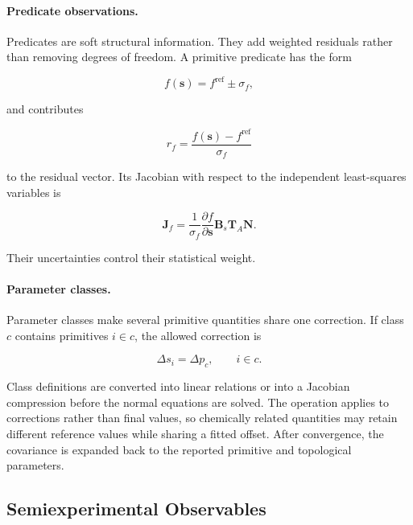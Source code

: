 \documentclass[journal=jctcce,manuscript=article,maxauthors=999]{achemso}
\begin{document}
\paragraph{Predicate observations.}

Predicates are soft structural information. They add weighted residuals rather
than removing degrees of freedom.\cite{Bartell1975Predicate} A primitive
predicate has the form

\begin{equation}
f(\mathbf{s})
=
f^{\mathrm{ref}}
\pm
\sigma_f ,
\end{equation}

and contributes

\begin{equation}
r_f
=
\frac{f(\mathbf{s})-f^{\mathrm{ref}}}{\sigma_f}
\end{equation}

to the residual vector. Its Jacobian with respect to the independent
least-squares variables is

\begin{equation}
\mathbf{J}_f
=
\frac{1}{\sigma_f}
\frac{\partial f}{\partial\mathbf{s}}
\mathbf{B}_s
\mathbf{T}_{A}
\mathbf{N}.
\end{equation}

Their uncertainties control their statistical weight.

\paragraph{Parameter classes.}

Parameter classes make several primitive quantities share one correction. If
class $c$ contains primitives $i\in c$, the allowed correction is

\begin{equation}
\Delta s_i
=
\Delta p_c,
\qquad
i\in c .
\end{equation}

Class definitions are converted into linear relations or into a Jacobian
compression before the normal equations are solved. The operation applies to
corrections rather than final values, so chemically related quantities may
retain different reference values while sharing a fitted offset. After
convergence, the covariance is expanded back to the reported primitive and
topological parameters.


\subsection{Semiexperimental Observables}
\end{document}

